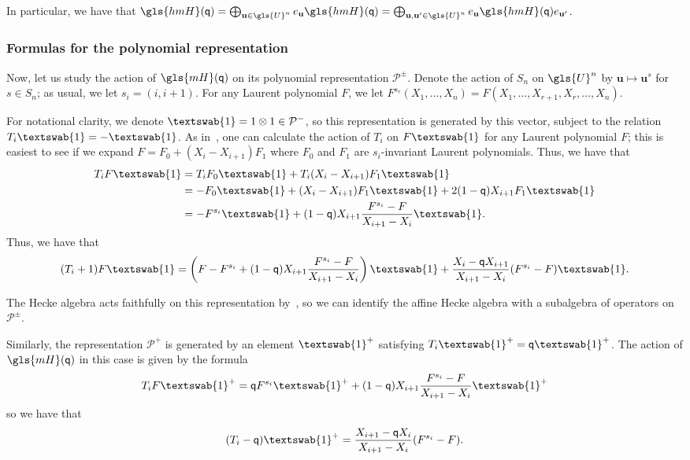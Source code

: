\documentclass[10pt]{article}
\theoremstyle{definition}
\newcommand{\pq}{\mathsf{q}}
\newcommand{\hone}{\text{\textswab{1}}}
\newcommand{\Bu}{\mathbf{u}}
\newcommand{\cP}{\mathcal{P}}
\newcommand{\mH}{\gls{mH}}
\newcommand{\hmH}{\gls{hmH}}
\begin{document}

In particular,
we have that $\hmH(\pq)=\bigoplus_{\Bu\in \gls{U}^n}e_{\Bu}\hmH(\pq)=\bigoplus_{\Bu,\Bu'\in \gls{U}^n}e_{\Bu}\hmH(\pq) e_{\Bu'}$. 

\subsubsection{Formulas for the polynomial representation}
\label{sec:form-polyn-repr}


Now, let us study the action of $\mH(\pq)$ on its polynomial
representation $\cP^{\pm}$. Denote the action of $S_n$ on $\gls{U}^n$ by $\Bu\mapsto \Bu^s$ for $s\in
S_n$; as usual, we let $s_i=(i, i+1)$. For any Laurent polynomial $F$,
we let $F^{s_r}(X_1,\dots,X_n)=F(X_1,\dots,X_{r+1},X_r,\dots, X_n)$. 

For notational clarity, we denote $\hone=1\otimes 1\in \cP^-$, so this
representation is generated by this vector, subject to the relation
$T_i \hone=-\hone$. As in~\cite[(4.3.3)]{MacHecke}, one can calculate the action of $T_i$ on
$F \hone$ 
for any Laurent polynomial $F$; this is easiest to see if we expand
$F=F_0+(X_i-X_{i+1})F_1$ where $F_0$ and $F_1$ are $s_i$-invariant
Laurent polynomials. Thus, we have that 
\begin{align*}
 T_i F\hone&= T_i F_0\hone+T_i(X_i-X_{i+1})F_1\hone\\
 &=-F_0\hone+(X_i-X_{i+1})F_1\hone+2(1-\pq)
X_{i+1}F_1\hone\\
&= -F^{s_i}\hone+ (1-\pq)
X_{i+1}\frac{F^{s_i}-F}{X_{i+1}-X_i}\hone.
\end{align*}
Thus, we have that 
\[(T_i+1) F\hone =\left(F-F^{s_i}+ (1-\pq)
X_{i+1}\frac{F^{s_i}-F}{X_{i+1}-X_i}\right)\hone+\frac{X_i-\pq X_{i+1}}{X_{i+1}-X_i} (F^{s_i}-F)\hone.\]

The Hecke algebra acts faithfully on this
representation by~\cite[(4.3.10)]{MacHecke}, so we can identify the affine Hecke algebra with a
subalgebra of operators on $\cP^\pm$.

Similarly, the representation $\cP^+$ is
generated by an element $\hone^+$ satisfying $T_i\hone^+=\pq \hone^+$.
The action of $\gls{mH}(\pq)$ in this case is given by the formula
\[T_iF\hone^+=\pq F^{s_i}\hone^++(1-\pq)X_{i+1}\frac{F^{s_i}-F}{X_{i+1}-X_i}\hone^+\]
so we have that 
\[(T_i-\pq)\hone^+=\frac{X_{i+1}-\pq X_i}{X_{i+1}-X_i}( F^{s_i}-F).\]
\end{document}
